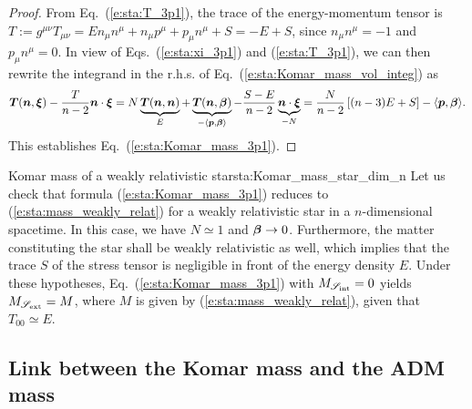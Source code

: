 \begin{proof}
From Eq.~(\ref{e:sta:T_3p1}), the trace of the energy-momentum tensor
is $T := g^{\mu\nu} T_{\mu\nu} = E n_\mu n^\mu + n_\mu p^\mu + p_\mu n^\mu + S = - E + S$,
since $n_\mu n^\mu = - 1$ and $p_\mu n^\mu = 0$.
In view of Eqs.~(\ref{e:sta:xi_3p1}) and (\ref{e:sta:T_3p1}), we can then rewrite
the integrand in the r.h.s. of Eq.~(\ref{e:sta:Komar_mass_vol_integ}) as
\[
 \bm{T}(\bm{n}, \bm{\xi}) - \frac{T}{n-2} \bm{n}\cdot \bm{\xi} =
 N \underbrace{\bm{T}(\bm{n}, \bm{n})}_{E}
 + \underbrace{\bm{T}(\bm{n}, \bm{\beta})}_{-\langle \bm{p}, \bm{\beta} \rangle}
 - \frac{S - E}{n-2} \underbrace{\bm{n}\cdot \bm{\xi}}_{-N}
 =  \frac{N}{n-2} \left[ (n-3) E + S \right] - \langle \bm{p}, \bm{\beta} \rangle .
\]
This establishes Eq.~(\ref{e:sta:Komar_mass_3p1}).
\end{proof}

\begin{texample}{Komar mass of a weakly relativistic star}{sta:Komar_mass_star_dim_n}
Let us check that formula (\ref{e:sta:Komar_mass_3p1}) reduces
to (\ref{e:sta:mass_weakly_relat}) for a weakly relativistic
star in a $n$-dimensional spacetime.
In this case, we have $N\simeq 1$ and
$\bm{\beta} \to 0$. Furthermore,
the matter constituting the star shall
be weakly relativistic as well, which implies that the trace $S$ of the stress
tensor is negligible in front of the energy density $E$. Under these
hypotheses, Eq.~(\ref{e:sta:Komar_mass_3p1}) with $M_{\mathscr{S}_{\rm int}} =0$
yields $M_{\mathscr{S}_{\rm ext}} = M$, where
$M$ is given by (\ref{e:sta:mass_weakly_relat}),
given that $T_{00} \simeq E$.
\end{texample}

\subsection{Link between the Komar mass and the ADM mass}  \label{s:sta:Komar_ADM}

